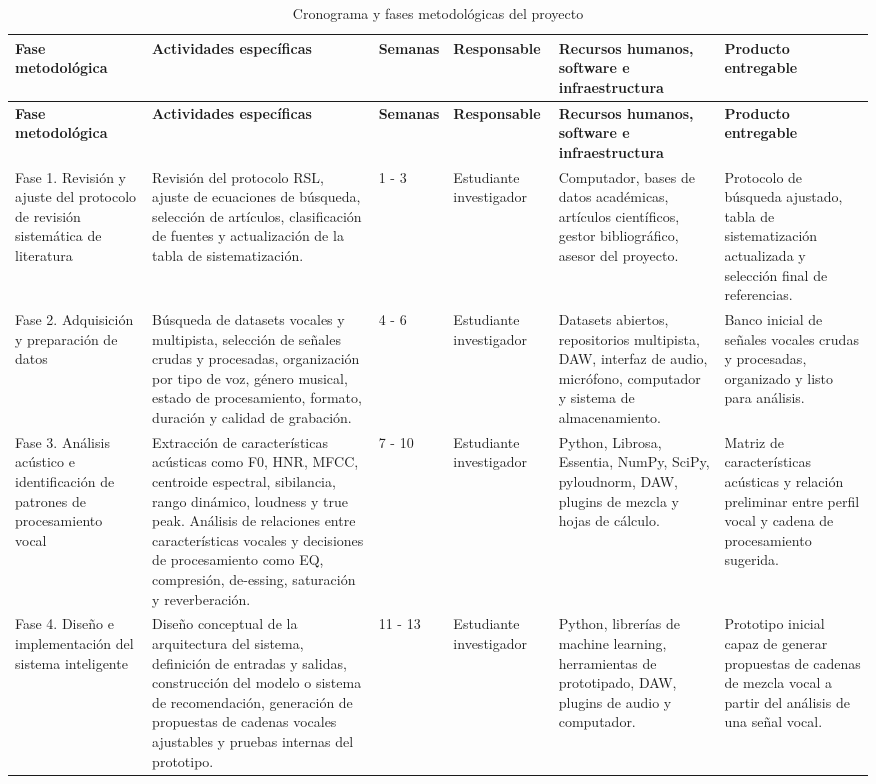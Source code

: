 \documentclass[12pt]{article}
\begin{document}
\begin{longtable}{|p{2.2cm}|p{3.5cm}|p{1.0cm}|p{1.8cm}|p{2.8cm}|p{2.8cm}|}
\caption{Cronograma y fases metodológicas del proyecto}
\label{tab:cronograma} \\
\hline
\textbf{Fase metodológica} & \textbf{Actividades específicas} & \textbf{Semanas} & \textbf{Responsable} & \textbf{Recursos humanos, software e infraestructura} & \textbf{Producto entregable} \\
\hline
\endfirsthead
\hline
\textbf{Fase metodológica} & \textbf{Actividades específicas} & \textbf{Semanas} & \textbf{Responsable} & \textbf{Recursos humanos, software e infraestructura} & \textbf{Producto entregable} \\
\hline
\endhead
\hline
\endfoot
Fase 1. Revisión y ajuste del protocolo de revisión sistemática de literatura & Revisión del protocolo RSL, ajuste de ecuaciones de búsqueda, selección de artículos, clasificación de fuentes y actualización de la tabla de sistematización. & 1 - 3 & Estudiante investigador & Computador, bases de datos académicas, artículos científicos, gestor bibliográfico, asesor del proyecto. & Protocolo de búsqueda ajustado, tabla de sistematización actualizada y selección final de referencias. \\
\hline
Fase 2. Adquisición y preparación de datos & Búsqueda de datasets vocales y multipista, selección de señales crudas y procesadas, organización por tipo de voz, género musical, estado de procesamiento, formato, duración y calidad de grabación. & 4 - 6 & Estudiante investigador & Datasets abiertos, repositorios multipista, DAW, interfaz de audio, micrófono, computador y sistema de almacenamiento. & Banco inicial de señales vocales crudas y procesadas, organizado y listo para análisis. \\
\hline
Fase 3. Análisis acústico e identificación de patrones de procesamiento vocal & Extracción de características acústicas como F0, HNR, MFCC, centroide espectral, sibilancia, rango dinámico, loudness y true peak. Análisis de relaciones entre características vocales y decisiones de procesamiento como EQ, compresión, de-essing, saturación y reverberación. & 7 - 10 & Estudiante investigador & Python, Librosa, Essentia, NumPy, SciPy, pyloudnorm, DAW, plugins de mezcla y hojas de cálculo. & Matriz de características acústicas y relación preliminar entre perfil vocal y cadena de procesamiento sugerida. \\
\hline
Fase 4. Diseño e implementación del sistema inteligente & Diseño conceptual de la arquitectura del sistema, definición de entradas y salidas, construcción del modelo o sistema de recomendación, generación de propuestas de cadenas vocales ajustables y pruebas internas del prototipo. & 11 - 13 & Estudiante investigador & Python, librerías de machine learning, herramientas de prototipado, DAW, plugins de audio y computador. & Prototipo inicial capaz de generar propuestas de cadenas de mezcla vocal a partir del análisis de una señal vocal. \\

\end{longtable}
\end{document}
